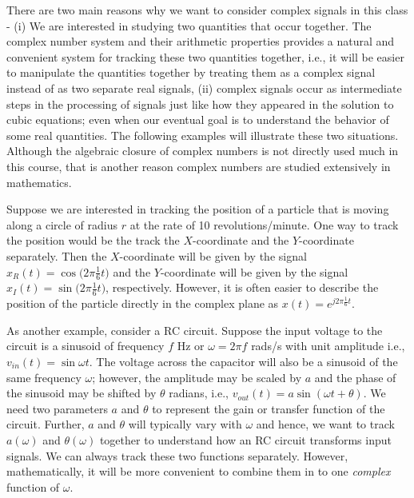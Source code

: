 There are two main reasons why we want to consider complex signals in this class - (i) We are interested in studying two quantities that occur together. The complex number system
and their arithmetic properties provides a natural and convenient system for tracking these two quantities together, i.e., it will be easier to manipulate the quantities together by treating them as a complex signal instead of as two separate real signals, (ii) complex signals occur as intermediate steps in the processing of signals just like how they appeared in the solution to cubic equations; even when our eventual goal is to understand the behavior of some real quantities. The following examples will illustrate these two situations.
Although the algebraic closure of complex numbers is not directly used much in this course,
that is another reason complex numbers are studied extensively in mathematics.


\begin{example}
Suppose we are interested in tracking the position of a particle that is moving along a circle of radius $r$ at the rate of 10 revolutions/minute.
One way to track the position would be the track the $X$-coordinate and the $Y$-coordinate separately.
Then the $X$-coordinate will be given by the signal $x_R(t) = \cos\big(2 \pi \frac{1}{6} t \big)$ and
the $Y$-coordinate will be given by the signal $x_I(t) = \sin \big(2 \pi \frac{1}{6} t \big)$, respectively.
However, it is often easier to describe the position of the particle directly in the complex plane as
$x(t) = e^{j 2 \pi \frac{1}{6} t}$.
\end{example}

\begin{example}
As another example, consider a RC circuit. Suppose the input voltage to the circuit is
a sinusoid of frequency $f$ Hz or $\omega = 2 \pi f$ rads/s with unit amplitude i.e., $v_{in}(t) = \sin \omega t$.
The voltage across the capacitor will also be a sinusoid of the same frequency $\omega$;
however, the amplitude may be scaled by $a$ and the phase of the sinusoid may be shifted by $\theta$ radians, i.e., $v_{out}(t) = a \sin(\omega t + \theta)$.
We need two parameters $a$ and $\theta$ to represent the gain or transfer function of the circuit.
Further, $a$ and $\theta$ will typically vary with $\omega$ and hence, we want to track $a(\omega)$ and $\theta(\omega)$ together to understand how an RC circuit transforms input signals.
We can always track these two functions separately.
However, mathematically, it will be more convenient to combine them in to one {\em complex} function of $\omega$.
\end{example}

